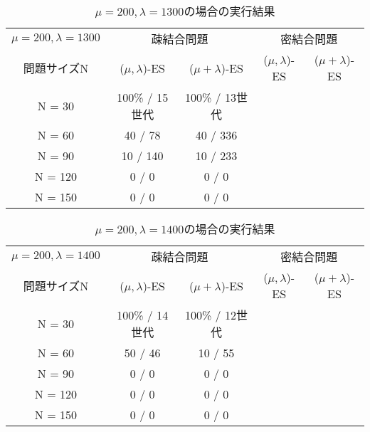 \documentclass[a4j]{jarticle}
\begin{document}
\begin{table}[htb]
 \begin{center}
  \begin{tabular}[tb]{|c||c|c||c|c|} \hline
   $\mu = 200, \lambda = 1300$& \multicolumn{2}{c||}{疎結合問題} &
   \multicolumn{2}{c|}{密結合問題} \\ \cline{2-5}
   問題サイズN& ($\mu, \lambda$)-ES& ($\mu + \lambda$)-ES& ($\mu, \lambda$)-ES&
   ($\mu + \lambda$)-ES \\ \hline \hline
   N = 30& 100\% / 15世代& 100\% / 13世代& & \\ \hline
   N = 60& 40 / 78& 40 / 336& & \\ \hline
   N = 90& 10 / 140& 10 / 233& & \\ \hline
   N = 120& 0 / 0& 0 / 0& & \\ \hline
   N = 150& 0 / 0& 0 / 0& & \\ \hline
  \end{tabular}
  \caption{$\mu = 200, \lambda = 1300$の場合の実行結果}
  \label{213}
 \end{center}
\end{table}

\clearpage
\begin{table}[htb]
 \begin{center}
  \begin{tabular}[tb]{|c||c|c||c|c|} \hline
   $\mu = 200, \lambda = 1400$& \multicolumn{2}{c||}{疎結合問題} &
   \multicolumn{2}{c|}{密結合問題} \\ \cline{2-5}
   問題サイズN& ($\mu, \lambda$)-ES& ($\mu + \lambda$)-ES& ($\mu, \lambda$)-ES&
   ($\mu + \lambda$)-ES \\ \hline \hline
   N = 30& 100\% / 14世代& 100\% / 12世代& & \\ \hline
   N = 60& 50 / 46& 10 / 55& & \\ \hline
   N = 90& 0 / 0& 0 / 0& & \\ \hline
   N = 120& 0 / 0& 0 / 0& & \\ \hline
   N = 150& 0 / 0& 0 / 0& & \\ \hline
  \end{tabular}
  \caption{$\mu = 200, \lambda = 1400$の場合の実行結果}
  \label{214}
 \end{center}
\end{table}
\end{document}
